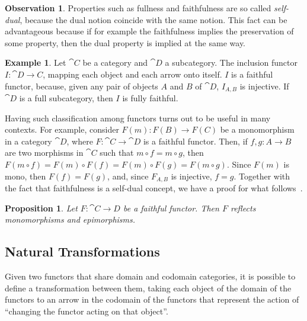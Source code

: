 \documentclass[a4paper, twoside,openright]{report}
\theoremstyle{plain}
\newtheorem{prop}[theorem]{Proposition}
\theoremstyle{definition}
\newtheorem{example}[theorem]{Example}
\newtheorem{obs}[theorem]{Observation}
\begin{document}
\begin{obs}
    Properties such as fullness and faithfulness are so called \emph{self-dual}, because the dual notion coincide with the same notion. This fact can be advantageous because if for example the faithfulness implies the preservation of some property, then the dual property is implied at the same way.
\end{obs}

\begin{example}
    Let $\cat C$ be a category and $\cat D$ a subcategory. The inclusion functor $I: \cat{D \rightarrow C}$, mapping each object and each arrow onto itself. $I$ is a faithful functor, because, given any pair of objects $A$ and $B$ of $\cat D$, $I_{A, B}$ is injective. If $\cat D$ is a full subcategory, then $I$ is fully faithful.
\end{example}

Having such classification among functors turns out to be useful in many contexts. For example, consider $F(m): F(B) \rightarrow F(C)$ be a monomorphism in a category $\cat D$, where $F: \cat C \rightarrow \cat D$ is a faithful functor. Then, if $f, g: A \rightarrow B$ are two morphisms in $\cat C$ such that $m \circ f = m \circ g$, then $F(m \circ f) = F(m) \circ F(f) = F(m) \circ F(g) = F(m\circ g)$. Since $F(m)$ is mono, then $F(f) = F(g)$, and, since $F_{A, B}$ is injective, $f = g$. Together with the fact that faithfulness is a self-dual concept, we have a proof for what follows~\cite{Herrlich_Strecker_1979}.

\begin{prop}
    Let $F: \cat{C \rightarrow D}$ be a faithful functor. Then $F$ reflects monomorphisms and epimorphisms.
\end{prop}


\subsection{Natural Transformations}

Given two functors that share domain and codomain categories, it is possible to define a transformation between them, taking each object of the domain of the functors to an arrow in the codomain of the functors that represent the action of ``changing the functor acting on that object''.
\end{document}
